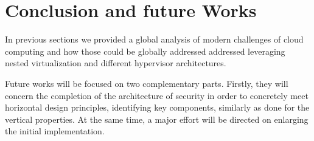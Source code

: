 \documentclass{sig-alternate}
\begin{document}
\section{Conclusion and future Works}
\label{sec:conclu}

In previous sections we provided a global analysis of modern challenges of cloud computing  and how those could be globally addressed addressed leveraging nested virtualization and different hypervisor architectures. 

Future works will be focused on two complementary parts.
Firstly, they will concern the completion of the architecture of security in order to concretely meet horizontal design principles, identifying key components, similarly as done for the vertical properties.
At the same time, a major effort will be directed on enlarging the initial implementation.

%


%
%
\end{document}
